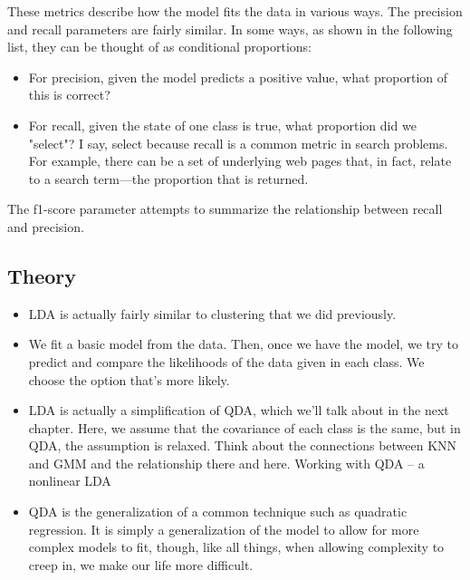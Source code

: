 These metrics describe how the model fits the data in various ways.
The precision and recall parameters are fairly similar. In some ways, as shown in the
following list, they can be thought of as conditional proportions:
\begin{itemize}
\item  For precision, given the model predicts a positive value, what proportion of this
is correct?
\item  For recall, given the state of one class is true, what proportion did we "select"? I say,
select because recall is a common metric in search problems. For example, there can
be a set of underlying web pages that, in fact, relate to a search term—the proportion
that is returned.
\end{itemize}

The f1-score parameter attempts to summarize the relationship between recall and
precision.
\subsection{Theory}
\begin{itemize}
\item LDA is actually fairly similar to clustering that we did previously. 
\item We fit a basic model from the
data. Then, once we have the model, we try to predict and compare the likelihoods of the data
given in each class. We choose the option that's more likely.
\item LDA is actually a simplification of QDA, which we'll talk about in the next chapter. Here, we
assume that the covariance of each class is the same, but in QDA, the assumption is relaxed.
Think about the connections between KNN and GMM and the relationship there and here.
Working with QDA – a nonlinear LDA
\item QDA is the generalization of a common technique such as quadratic regression. It is simply
a generalization of the model to allow for more complex models to fit, though, like all things,
when allowing complexity to creep in, we make our life more difficult.
\end{itemize}
